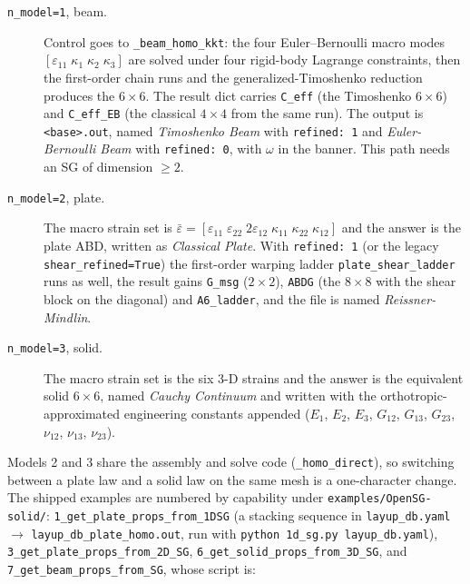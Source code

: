 \begin{description}
\item[\texttt{n\_model=1}, beam.] Control goes to \texttt{\_beam\_homo\_kkt}:
      the four Euler--Bernoulli macro modes
      $[\varepsilon_{11}\;\kappa_1\;\kappa_2\;\kappa_3]$ are solved under four
      rigid-body Lagrange constraints, then the first-order chain runs and the
      generalized-Timoshenko reduction produces the $6\times6$. The result dict
      carries \texttt{C\_eff} (the Timoshenko $6\times6$) and
      \texttt{C\_eff\_EB} (the classical $4\times4$ from the same run). The
      output is \texttt{<base>.out}, named \emph{Timoshenko Beam} with
      \texttt{refined: 1} and \emph{Euler-Bernoulli Beam} with
      \texttt{refined: 0}, with $\omega$ in the banner. This path needs an SG
      of dimension $\ge2$.
\item[\texttt{n\_model=2}, plate.] The macro strain set is
      $\bar\varepsilon = [\varepsilon_{11}\;\varepsilon_{22}\;2\varepsilon_{12}\;
      \kappa_{11}\;\kappa_{22}\;\kappa_{12}]$ and the answer is the plate ABD,
      written as \emph{Classical Plate}. With \texttt{refined: 1} (or the
      legacy \texttt{shear\_refined=True}) the first-order warping ladder
      \texttt{plate\_shear\_ladder} runs as well, the result gains
      \texttt{G\_msg} ($2\times2$), \texttt{ABDG} (the $8\times8$ with the
      shear block on the diagonal) and \texttt{A6\_ladder}, and the file is
      named \emph{Reissner-Mindlin}.
\item[\texttt{n\_model=3}, solid.] The macro strain set is the six 3-D strains
      and the answer is the equivalent solid $6\times6$, named \emph{Cauchy
      Continuum} and written with the
      orthotropic-approximated engineering constants appended
      ($E_1$, $E_2$, $E_3$, $G_{12}$, $G_{13}$, $G_{23}$, $\nu_{12}$,
      $\nu_{13}$, $\nu_{23}$).
\end{description}

Models 2 and 3 share the assembly and solve code (\texttt{\_homo\_direct}), so
switching between a plate law and a solid law on the same mesh is a
one-character change. The shipped examples are numbered by capability under
\texttt{examples/OpenSG-solid/}: \texttt{1\_get\_plate\_props\_from\_1DSG}
(a stacking sequence in \texttt{layup\_db.yaml} $\rightarrow$
\texttt{layup\_db\_plate\_homo.out}, run with
\texttt{python 1d\_sg.py layup\_db.yaml}),
\texttt{3\_get\_plate\_props\_from\_2D\_SG},
\texttt{6\_get\_solid\_props\_from\_3D\_SG}, and
\texttt{7\_get\_beam\_props\_from\_SG}, whose script is:

